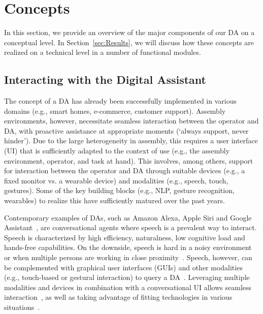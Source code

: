 \section{Concepts}\label{sec:Concepts}
In this section, we provide an overview of the major components of our DA on a conceptual level. In Section~\ref{sec:Results}, we will discuss how these concepts are realized on a technical level in a number of functional modules.

\subsection{Interacting with the Digital Assistant}\label{sec:DA}
The concept of a DA has already been successfully implemented in various domains (e.g., smart homes, e-commerce, customer support). Assembly environments, however, necessitate seamless interaction between the operator and DA, with proactive assistance at appropriate moments (`always support, never hinder'). Due to the large heterogeneity in assembly, this requires a user interface (UI) that is sufficiently adapted to the context of use (e.g., the assembly environment, operator, and task at hand). This involves, among others, support for interaction between the operator and DA through suitable devices (e.g., a fixed monitor vs. a wearable device) and modalities (e.g., speech, touch, gestures). Some of the key building blocks (e.g., NLP, gesture recognition, wearables) to realize this have sufficiently matured over the past years.

Contemporary examples of DAs, such as Amazon Alexa, Apple Siri and Google Assistant~\cite{de2020intelligent}, are conversational agents where speech is a prevalent way to interact. Speech is characterized by high efficiency, naturalness, low cognitive load and hands-free capabilities. On the downside, speech is hard in a noisy environment or when multiple persons are working in close proximity~\cite{hou2018VisualFeedbackDesign}. Speech, however, can be complemented with graphical user interfaces (GUIs) and other modalities (e.g., touch-based or gestural interaction) to query a DA~\cite{belkadi2020IntelligentAssistantSystem,klopfenstein2017RiseBotsSurvey,heller2019TaskHerderWearableMinimal}. Leveraging multiple modalities and devices in combination with a conversational UI allows seamless interaction~\cite{white2019MultideviceDigitalAssistance}, as well as taking advantage of fitting technologies in various situations~\cite{heinz2018MultideviceAssistiveSystem}. 


